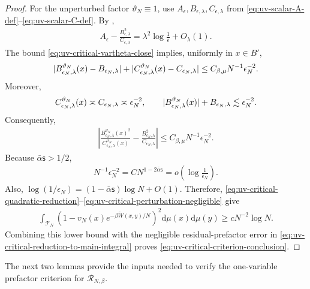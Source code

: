 \documentclass[11pt,reqno]{amsart}
\numberwithin{equation}{section}
\theoremstyle{plain}
\theoremstyle{remark}
\DeclarePairedDelimiter{\abs}{\lvert}{\rvert}
\newcommand{\md}{\mathrm{d}}
\newcommand{\tl}{\widetilde}
\newcommand{\be}{\beta}
\newcommand{\s}{\mathsf{s}}
\begin{document}
\begin{proof}
For the unperturbed factor \(\vartheta_N\equiv1\), use \(A_\epsilon,B_{\epsilon,\lambda},C_{\epsilon,\lambda}\) from \eqref{eq:uv-scalar-A-def}--\eqref{eq:uv-scalar-C-def}.  By ,
\begin{align}\label{eq:uv-critical-unperturbed-minimum}
 A_\epsilon-\frac{B_{\epsilon,\lambda}^2}{C_{\epsilon,\lambda}}
 =\lambda^2\log\frac1\epsilon+O_\lambda(1).
\end{align}
The bound \eqref{eq:uv-critical-vartheta-close} implies, uniformly in \(x\in B'\),
\begin{align}\label{eq:uv-critical-coefficient-perturbations}
 \abs{B_{\epsilon_N,\lambda}^{\vartheta_N}(x)-B_{\epsilon_N,\lambda}}
 +\abs{C_{\epsilon_N,\lambda}^{\vartheta_N}(x)-C_{\epsilon_N,\lambda}}
 \le C_{\be,\mu}N^{-1}\epsilon_N^{-2}.
\end{align}
Moreover,
\begin{align}\label{eq:uv-critical-coefficient-sizes}
 C_{\epsilon_N,\lambda}^{\vartheta_N}(x)\asymp C_{\epsilon_N,\lambda}\asymp\epsilon_N^{-2},
 \qquad
 \abs{B_{\epsilon_N,\lambda}^{\vartheta_N}(x)}+B_{\epsilon_N,\lambda}\lesssim\epsilon_N^{-2}.
\end{align}
Consequently,
\begin{align}\label{eq:uv-critical-perturbation-ratio}
 \left|
 \frac{B_{\epsilon_N,\lambda}^{\vartheta_N}(x)^2}
 {C_{\epsilon_N,\lambda}^{\vartheta_N}(x)}
 -\frac{B_{\epsilon_N,\lambda}^2}{C_{\epsilon_N,\lambda}}
 \right|
 \le C_{\be,\mu}N^{-1}\epsilon_N^{-2}.
\end{align}
Because \(\bar\alpha\s>1/2\),
\begin{align}\label{eq:uv-critical-perturbation-negligible}
 N^{-1}\epsilon_N^{-2}
 =C N^{1-2\bar\alpha\s}
 =o\left(\log\frac1{\epsilon_N}\right).
\end{align}
Also, \(\log(1/\epsilon_N)=(1-\bar\alpha\s)\log N+O(1)\).  Therefore, \eqref{eq:uv-critical-quadratic-reduction}--\eqref{eq:uv-critical-perturbation-negligible} give
\begin{align}\label{eq:uv-critical-main-integral-lower}
 \int_{\mathcal T_N}
 \left(1-v_N(x)e^{-\be\tl W(x,y)/N}\right)^2
 \md\mu(x)\md\mu(y)
 \ge cN^{-2}\log N.
\end{align}
Combining this lower bound with the negligible residual-prefactor error in \eqref{eq:uv-critical-reduction-to-main-integral} proves \eqref{eq:uv-critical-criterion-conclusion}.
\end{proof}

The next two lemmas provide the inputs needed to verify the one-variable prefactor criterion for \(\mathcal R_{N,\be}\).
\end{document}
